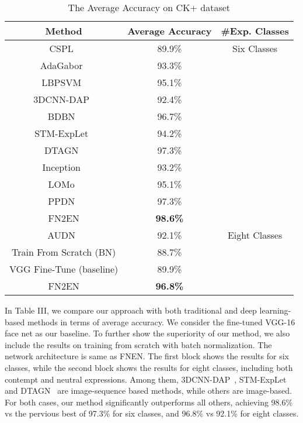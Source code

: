 \documentclass[a4paper, 10pt, conference]{ieeeconf}      %
\begin{document}
\begin{table}
\caption{The Average Accuracy on CK+ dataset}
\label{accuracy_ck}
\begin{center}
\begin{tabular}{|c||c||c|}
\hline
Method & Average Accuracy & \#Exp. Classes\\
\hline
CSPL~\cite{zhong2012learning} & 89.9\% & Six Classes\\
AdaGabor~\cite{bartlett2005recognizing} & 93.3\% &\\
LBPSVM~\cite{feng2007facial} & 95.1\% &\\
3DCNN-DAP~\cite{liu2014deeply} & 92.4\% &\\
BDBN~\cite{liu2014facial} & 96.7\% &\\
STM-ExpLet~\cite{liu2014learning} & 94.2\% &\\
DTAGN~\cite{jung2015deep} & 97.3\% &\\
Inception~\cite{mollahosseini2016going} & 93.2\% &\\
LOMo~\cite{sikka2016lomo} & 95.1\% &\\
PPDN~\cite{zhao2016peak} & 97.3\% &\\
FN2EN & \textbf{98.6\%} &\\
\hline
AUDN~\cite{liu2013aware} & 92.1\% & Eight Classes\\
Train From Scratch (BN) & 88.7\% &\\
VGG Fine-Tune (baseline) & 89.9\% &\\
FN2EN & \textbf{96.8\%} &\\
\hline
\end{tabular}
\end{center}
\vspace{-2mm}
\end{table}

In Table III, we compare our approach with both traditional and deep learning-based methods in terms of average accuracy. We consider the fine-tuned VGG-16 face net as our baseline. To further show the superiority of our method, we also include the results on training from scratch with batch normalization. The network architecture is same as FNEN. The first block shows the results for six classes, while the second block shows the results for eight classes, including both contempt and neutral expressions. Among them, 3DCNN-DAP~\cite{liu2014deeply}, STM-ExpLet~\cite{liu2014learning} and DTAGN~\cite{jung2015deep} are image-sequence based methods, while others are image-based. For both cases, our method significantly outperforms all others, achieving 98.6\% vs the pervious best of 97.3\% for six classes, and 96.8\% vs 92.1\% for eight classes.
\end{document}
